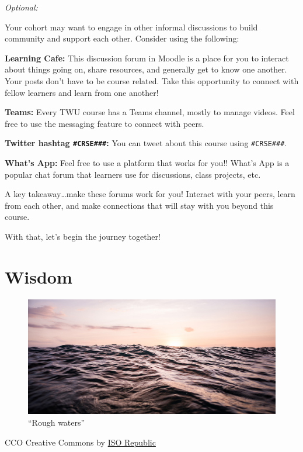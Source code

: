 \documentclass[
]{book}
\begin{document}
\emph{Optional:}

Your cohort may want to engage in other informal discussions to build community and support each other. Consider using the following:

\textbf{Learning Cafe:} This discussion forum in Moodle is a place for you to interact about things going on, share resources, and generally get to know one another. Your posts don't have to be course related. Take this opportunity to connect with fellow learners and learn from one another!

\textbf{Teams:} Every TWU course has a Teams channel, mostly to manage videos. Feel free to use the messaging feature to connect with peers.

\textbf{Twitter hashtag \texttt{\#CRSE\#\#\#}:} You can tweet about this course using \texttt{\#CRSE\#\#\#}.

\textbf{What's App:} Feel free to use a platform that works for you!! What's App is a popular chat forum that learners use for discussions, class projects, etc.

A key takeaway\ldots make these forums work for you! Interact with your peers, learn from each other, and make connections that will stay with you beyond this course.

With that, let's begin the journey together!

\hypertarget{wisdom}{%
\chapter{Wisdom}\label{wisdom}}

\begin{figure}
\centering
\includegraphics{assets/u1/Unit1overview.jpg}
\caption{``Rough waters''}
\end{figure}

CCO Creative Commons by \href{https://isorepublic.com/photo/sun-reflecting-on-waves/}{ISO Republic}
\end{document}
